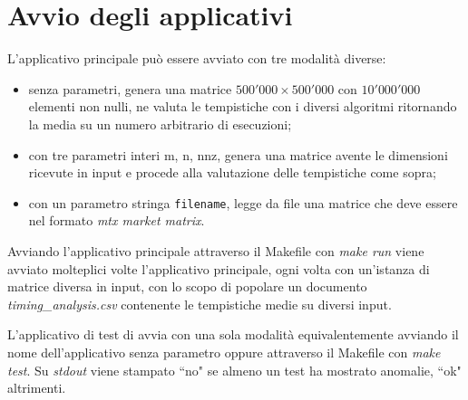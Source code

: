 \section{Avvio degli applicativi}

L'applicativo principale può essere avviato con tre modalità diverse:
\begin{itemize}
    \item senza parametri, genera una matrice $500'000\times 500'000$ con $10'000'000$ elementi non nulli, ne valuta le tempistiche con i diversi algoritmi ritornando la media su un numero arbitrario di esecuzioni;
    \item con tre parametri interi $\mathrm{m}$, $\mathrm{n}$, $\mathrm{nnz}$, genera una matrice avente le dimensioni ricevute in input e procede alla valutazione delle tempistiche come sopra;
    \item con un parametro stringa \texttt{filename}, legge da file una matrice che deve essere nel formato \emph{mtx market matrix}.
\end{itemize}

Avviando l'applicativo principale attraverso il Makefile con \emph{make run} viene avviato molteplici volte l'applicativo principale, ogni volta con un'istanza di matrice diversa in input, con lo scopo di popolare un documento \emph{timing\_analysis.csv} contenente le tempistiche medie su diversi input. 

L'applicativo di test di avvia con una sola modalità equivalentemente avviando il nome dell'applicativo senza parametro oppure attraverso il Makefile con \emph{make test}. Su \emph{stdout} viene stampato ``no" se almeno un test ha mostrato anomalie, ``ok" altrimenti. 
